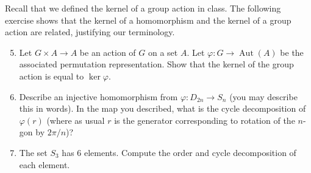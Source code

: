 \documentclass[11pt]{article}
\begin{document}
Recall that we defined the kernel of a group action in class.  The following exercise shows that the kernel of a homomorphism and the kernel of a group action are related, justifying our terminology.
\begin{enumerate}
\setcounter{enumi}{4}
\item Let $G\times A\to A$ be an action of $G$ on a set $A$.  Let $\varphi:G\to\operatorname{Aut}(A)$ be the associated permutation representation.  Show that the kernel of the group action is equal to $\ker\varphi$.
\item Describe an injective homomorphism from $\varphi:D_{2n}\to S_n$ (you may describe this in words).  In the map you described, what is the cycle decomposition of $\varphi(r)$ (where as usual $r$ is the generator corresponding to rotation of the $n$-gon by $2\pi/n$)?
\item The set $S_3$ has 6 elements.  Compute the order and cycle decomposition of each element.
\end{enumerate}
\end{document}
